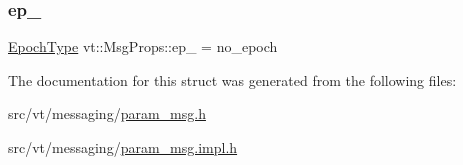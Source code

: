 \mbox{\label{structvt_1_1_msg_props_a51aab5d92b3681547193b74f6449226f}} 
\subsubsection{\texorpdfstring{ep\+\_\+}{ep\_}}
{\footnotesize\ttfamily \hyperlink{namespacevt_a81d11b28122d43bf9834577e4a06440f}{Epoch\+Type} vt\+::\+Msg\+Props\+::ep\+\_\+ = no\+\_\+epoch\hspace{0.3cm}{\ttfamily [private]}}



The documentation for this struct was generated from the following files\+:\begin{DoxyCompactItemize}
\item 
src/vt/messaging/\hyperlink{param__msg_8h}{param\+\_\+msg.\+h}\item 
src/vt/messaging/\hyperlink{param__msg_8impl_8h}{param\+\_\+msg.\+impl.\+h}\end{DoxyCompactItemize}
